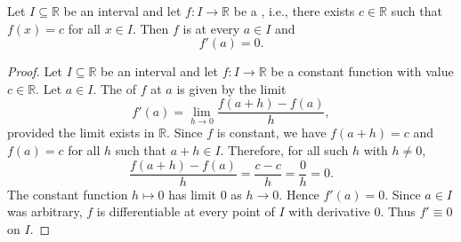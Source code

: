 \begin{proposition} \label{proposition:derivative_of_a_constant_real_valued_function_on_a_real_interval}
    Let $I \subseteq \mathbb{R}$ be an interval and let $f : I \to \mathbb{R}$ be a , i.e., there exists $c \in \mathbb{R}$ such that $f(x) = c$ for all $x \in I$. Then $f$ is  at every $a \in I$ and
    $$f'(a) = 0.$$
\end{proposition}
\begin{proof}
    Let $I \subseteq \mathbb{R}$ be an interval and let $f : I \to \mathbb{R}$ be a constant function with value $c \in \mathbb{R}$. Let $a \in I$. The  of $f$ at $a$ is given by the limit
    $$f'(a) = \lim_{h \to 0} \frac{f(a+h) - f(a)}{h},$$
     provided the limit exists in $\mathbb{R}$. Since $f$ is constant, we have $f(a+h) = c$ and $f(a) = c$ for all $h$ such that $a+h \in I$. Therefore, for all such $h$ with $h \neq 0$,
    $$\frac{f(a+h) - f(a)}{h} = \frac{c - c}{h} = \frac{0}{h} = 0.$$
    The constant function $h \mapsto 0$ has limit $0$ as $h \to 0$. 
    Hence $f'(a) = 0$. Since $a \in I$ was arbitrary, $f$ is differentiable at every point of $I$ with derivative $0$. Thus $f' \equiv 0$ on $I$.
\end{proof}